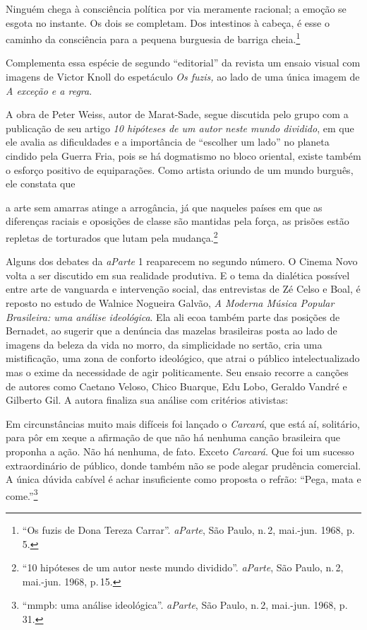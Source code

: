 \startblockquote
Ninguém chega à consciência política por via meramente racional; a
emoção se esgota no instante. Os dois se completam. Dos intestinos à
cabeça, é esse o caminho da consciência para a pequena burguesia de
barriga cheia.\footnote{“Os fuzis de Dona Tereza Carrar”. {\it aParte},
  São Paulo, n.\,2, mai.-jun. 1968, p.\,5.}
\stopblockquote

Complementa essa espécie de segundo “editorial” da revista um ensaio
visual com imagens de Victor Knoll do espetáculo {\it Os fuzis,} ao lado
de uma única imagem de {\it A exceção e a regra}.

A obra de Peter Weiss, autor de Marat-Sade, segue discutida pelo grupo
com a publicação de seu artigo {\it 10 hipóteses de um autor neste mundo
dividido}, em que ele avalia as dificuldades e a importância de
“escolher um lado” no planeta cindido pela Guerra Fria, pois se há
dogmatismo no bloco oriental, existe também o esforço positivo de
equiparações. Como artista oriundo de um mundo burguês, ele constata que

\startblockquote
a arte sem amarras atinge a arrogância, já que naqueles países em que as
diferenças raciais e oposições de classe são mantidas pela força, as
prisões estão repletas de torturados que lutam pela mudança.\footnote{“10
  hipóteses de um autor neste mundo dividido”. {\it aParte}, São Paulo,
  n.\,2, mai.-jun. 1968, p.\,15.}
\stopblockquote

Alguns dos debates da {\it aParte} 1 reaparecem no segundo número. O
Cinema Novo volta a ser discutido em sua realidade produtiva. E o tema
da dialética possível entre arte de vanguarda e intervenção social, das
entrevistas de Zé Celso e Boal, é reposto no estudo de Walnice Nogueira
Galvão, {\it A Moderna Música Popular Brasileira: uma análise
ideológica}. Ela ali ecoa também parte das posições de Bernadet, ao
sugerir que a denúncia das mazelas brasileiras posta ao lado de imagens
da beleza da vida no morro, da simplicidade no sertão, cria uma
mistificação, uma zona de conforto ideológico, que atrai o público
intelectualizado mas o exime da necessidade de agir politicamente. Seu
ensaio recorre a canções de autores como Caetano Veloso, Chico Buarque,
Edu Lobo, Geraldo Vandré e Gilberto Gil. A autora finaliza sua análise
com critérios ativistas:

\startblockquote
Em circunstâncias muito mais difíceis foi lançado o {\it Carcará}, que
está aí, solitário, para pôr em xeque a afirmação de que não há nenhuma
canção brasileira que proponha a ação. Não há nenhuma, de fato. Exceto
{\it Carcará}. Que foi um sucesso extraordinário de público, donde
também não se pode alegar prudência comercial. A única dúvida cabível é
achar insuficiente como proposta o refrão: “Pega, mata e
come.”\footnote{“{\sc mmpb}: uma análise ideológica”. {\it aParte}, São Paulo,
  n.\,2, mai.-jun. 1968, p.\,31.}
\stopblockquote

